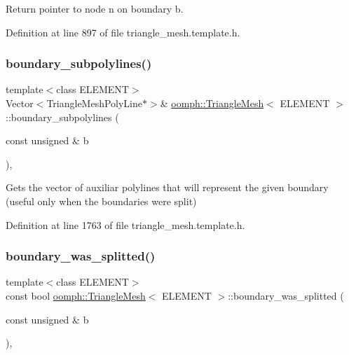 Return pointer to node n on boundary b. 



Definition at line 897 of file triangle\+\_\+mesh.\+template.\+h.

\mbox{\label{classoomph_1_1TriangleMesh_a14884948bb2b6e3246efe2a3a5c5f5db}} 
\subsubsection{\texorpdfstring{boundary\+\_\+subpolylines()}{boundary\_subpolylines()}}
{\footnotesize\ttfamily template$<$class E\+L\+E\+M\+E\+NT$>$ \\
Vector$<$Triangle\+Mesh\+Poly\+Line$\ast$$>$\& \hyperlink{classoomph_1_1TriangleMesh}{oomph\+::\+Triangle\+Mesh}$<$ E\+L\+E\+M\+E\+NT $>$\+::boundary\+\_\+subpolylines (\begin{DoxyParamCaption}\item[{const unsigned \&}]{b }\end{DoxyParamCaption})\hspace{0.3cm}{\ttfamily [inline]}, {\ttfamily [protected]}}



Gets the vector of auxiliar polylines that will represent the given boundary (useful only when the boundaries were split) 



Definition at line 1763 of file triangle\+\_\+mesh.\+template.\+h.

\mbox{\label{classoomph_1_1TriangleMesh_a23272907549db06e9c12ff3a7502d0e0}} 
\subsubsection{\texorpdfstring{boundary\+\_\+was\+\_\+splitted()}{boundary\_was\_splitted()}}
{\footnotesize\ttfamily template$<$class E\+L\+E\+M\+E\+NT$>$ \\
const bool \hyperlink{classoomph_1_1TriangleMesh}{oomph\+::\+Triangle\+Mesh}$<$ E\+L\+E\+M\+E\+NT $>$\+::boundary\+\_\+was\+\_\+splitted (\begin{DoxyParamCaption}\item[{const unsigned \&}]{b }\end{DoxyParamCaption})\hspace{0.3cm}{\ttfamily [inline]}, {\ttfamily [protected]}}



